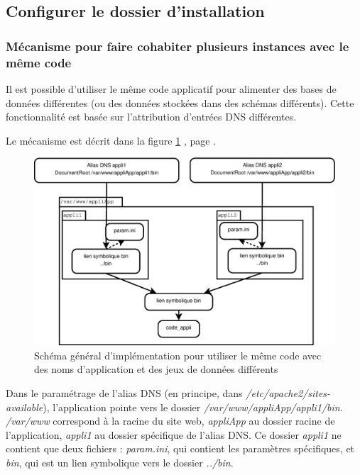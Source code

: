 \subsection{Configurer le dossier d'installation}

\subsubsection{Mécanisme pour faire cohabiter plusieurs instances avec le même code}
\label{dnsmultiple}
Il est possible d'utiliser le même code applicatif pour alimenter des bases de données différentes (ou des données stockées dans des schémas différents). Cette fonctionnalité est basée sur l'attribution d'entrées DNS différentes. 

Le mécanisme est décrit dans la figure \ref{dnsmultipleschema} \textit{}, page \pageref{dnsmultipleschema}.

\begin{figure}[H]
\includegraphics[width=\linewidth]{images/dnsmultiple}
\caption{\label{dnsmultipleschema}Schéma général d’implémentation pour utiliser le même code avec des noms d’application et des jeux de données différents}
\end{figure}

Dans le paramétrage de l’alias DNS (en principe, dans \textit{/etc/apache2/sites-available}), l’application pointe vers le dossier \textit{/var/www/appliApp/appli1/bin}. \textit{/var/www} correspond à la racine du site web, \textit{appliApp} au dossier racine de l’application, \textit{appli1} au dossier spécifique de l’alias DNS. Ce dossier \textit{appli1} ne contient que deux fichiers : \textit{param.ini}, qui contient les paramètres spécifiques, et \textit{bin}, qui est un lien symbolique vers le dossier \textit{../bin}.

